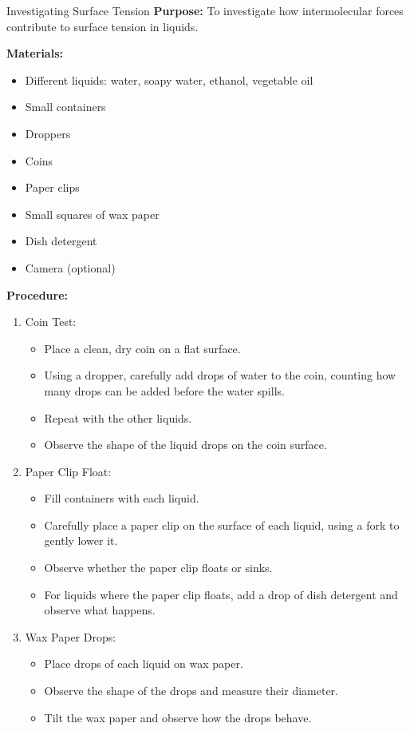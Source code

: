\begin{investigation}{Investigating Surface Tension}
\textbf{Purpose:} To investigate how intermolecular forces contribute to surface tension in liquids.

\textbf{Materials:}
\begin{itemize}
    \item Different liquids: water, soapy water, ethanol, vegetable oil
    \item Small containers
    \item Droppers
    \item Coins
    \item Paper clips
    \item Small squares of wax paper
    \item Dish detergent
    \item Camera (optional)
\end{itemize}

\textbf{Procedure:}
\begin{enumerate}
    \item Coin Test:
    \begin{itemize}
        \item Place a clean, dry coin on a flat surface.
        \item Using a dropper, carefully add drops of water to the coin, counting how many drops can be added before the water spills.
        \item Repeat with the other liquids.
        \item Observe the shape of the liquid drops on the coin surface.
    \end{itemize}
    
    \item Paper Clip Float:
    \begin{itemize}
        \item Fill containers with each liquid.
        \item Carefully place a paper clip on the surface of each liquid, using a fork to gently lower it.
        \item Observe whether the paper clip floats or sinks.
        \item For liquids where the paper clip floats, add a drop of dish detergent and observe what happens.
    \end{itemize}
    
    \item Wax Paper Drops:
    \begin{itemize}
        \item Place drops of each liquid on wax paper.
        \item Observe the shape of the drops and measure their diameter.
        \item Tilt the wax paper and observe how the drops behave.
    \end{itemize}
\end{enumerate}


\end{investigation}

